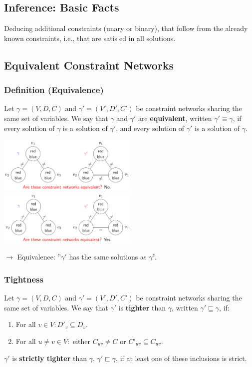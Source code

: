 \documentclass[conference]{styles/acmsiggraph}
\begin{document}
    \subsection{Inference: Basic Facts}
        Deducing additional constraints (unary or binary), that follow from the already known constraints, i.e., that are satised in all solutions.
    
    \subsection{Equivalent Constraint Networks}
        \subsubsection{Definition (Equivalence)}
            Let $\gamma = (V,D,C)$ and $\gamma' = (V',D',C')$ be constraint networks sharing the same set of variables.
            We say that $\gamma$ and $\gamma'$ are \textbf{equivalent}, written $\gamma' \equiv \gamma$, if every solution of $\gamma$ is a solution of $\gamma'$, and every solution of $\gamma'$ is a solution of $\gamma$.\newline
            
            \includegraphics[width=0.5\textwidth]{imgs/ECN_NO.png}\ \ \ \ \ \ 
            \includegraphics[width=0.5\textwidth]{imgs/ECN_YES.png}\newline
            
            $\rightarrow$ Equivalence: ''$\gamma'$ has the same solutions as $\gamma$''.
        
        \subsubsection{Tightness}
            Let $\gamma = (V,D,C)$ and $\gamma' = (V',D',C')$ be constraint networks sharing the same set of variables.
            We say that $\gamma'$ is \textbf{tighter} than $\gamma$, written $\gamma' \sqsubseteq \gamma$, if:
                \begin{enumerate}
                    \item For all $v \in V: D'_v \subseteq D_v$.
                    \item For all $u \neq v \in V:$ either $C_{uv} \neq C$ or $C'_{uv} \subseteq C_{uv}$.
                \end{enumerate}
            $\gamma'$ is \textbf{strictly tighter} than $\gamma$, $\gamma' \sqsubset \gamma$, if at least one of these inclusions is strict.
            
\end{document}

